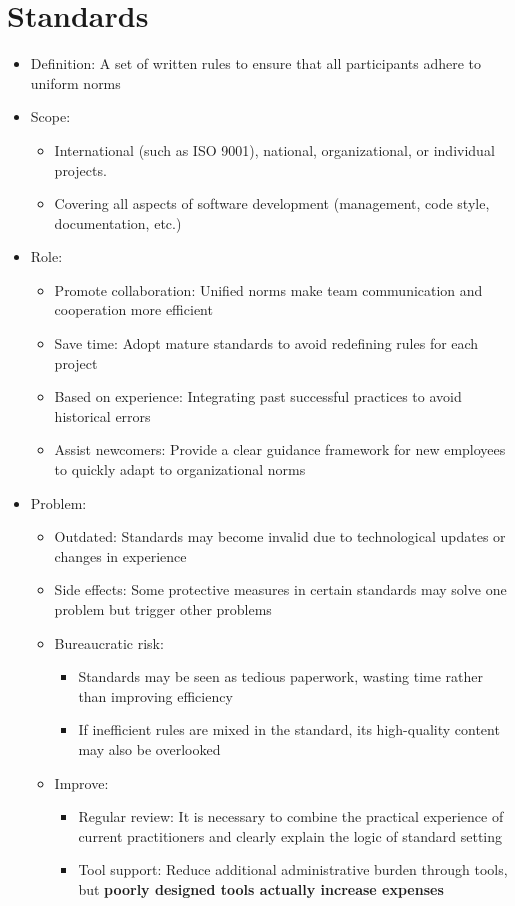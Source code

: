 \documentclass[12pt,openany]{book}
\begin{document}
\section{Standards}
\begin{itemize}
    \item Definition: A set of written rules to ensure that all participants adhere to uniform norms
    \item Scope:
    \begin{itemize}
        \item International (such as ISO 9001), national, organizational, or individual projects.
        \item Covering all aspects of software development (management, code style, documentation, etc.)
    \end{itemize}
    \item Role:
    \begin{itemize}
        \item Promote collaboration: Unified norms make team communication and cooperation more efficient
        \item Save time: Adopt mature standards to avoid redefining rules for each project
        \item Based on experience: Integrating past successful practices to avoid historical errors
        \item Assist newcomers: Provide a clear guidance framework for new employees to quickly adapt to organizational norms
    \end{itemize}
    \item Problem:
    \begin{itemize}
        \item Outdated: Standards may become invalid due to technological updates or changes in experience
        \item Side effects: Some protective measures in certain standards may solve one problem but trigger other problems
        \item Bureaucratic risk: 
        \begin{itemize}
            \item Standards may be seen as tedious paperwork, wasting time rather than improving efficiency
            \item If inefficient rules are mixed in the standard, its high-quality content may also be overlooked
        \end{itemize}
        \item Improve:
        \begin{itemize}
            \item Regular review: It is necessary to combine the practical experience of current practitioners and clearly explain the logic of standard setting
            \item Tool support: Reduce additional administrative burden through tools, but \textbf{poorly designed tools actually increase expenses}
        \end{itemize}
    \end{itemize}
\end{itemize}
\end{document}
